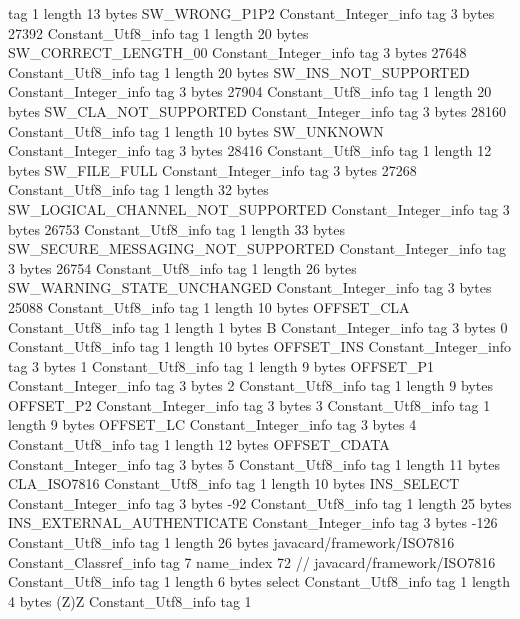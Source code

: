{{{			tag	1
			length	13
			bytes	SW_WRONG_P1P2
		}
		Constant_Integer_info {
			tag	3
			bytes	27392
		}
		Constant_Utf8_info {
			tag	1
			length	20
			bytes	SW_CORRECT_LENGTH_00
		}
		Constant_Integer_info {
			tag	3
			bytes	27648
		}
		Constant_Utf8_info {
			tag	1
			length	20
			bytes	SW_INS_NOT_SUPPORTED
		}
		Constant_Integer_info {
			tag	3
			bytes	27904
		}
		Constant_Utf8_info {
			tag	1
			length	20
			bytes	SW_CLA_NOT_SUPPORTED
		}
		Constant_Integer_info {
			tag	3
			bytes	28160
		}
		Constant_Utf8_info {
			tag	1
			length	10
			bytes	SW_UNKNOWN
		}
		Constant_Integer_info {
			tag	3
			bytes	28416
		}
		Constant_Utf8_info {
			tag	1
			length	12
			bytes	SW_FILE_FULL
		}
		Constant_Integer_info {
			tag	3
			bytes	27268
		}
		Constant_Utf8_info {
			tag	1
			length	32
			bytes	SW_LOGICAL_CHANNEL_NOT_SUPPORTED
		}
		Constant_Integer_info {
			tag	3
			bytes	26753
		}
		Constant_Utf8_info {
			tag	1
			length	33
			bytes	SW_SECURE_MESSAGING_NOT_SUPPORTED
		}
		Constant_Integer_info {
			tag	3
			bytes	26754
		}
		Constant_Utf8_info {
			tag	1
			length	26
			bytes	SW_WARNING_STATE_UNCHANGED
		}
		Constant_Integer_info {
			tag	3
			bytes	25088
		}
		Constant_Utf8_info {
			tag	1
			length	10
			bytes	OFFSET_CLA
		}
		Constant_Utf8_info {
			tag	1
			length	1
			bytes	B
		}
		Constant_Integer_info {
			tag	3
			bytes	0
		}
		Constant_Utf8_info {
			tag	1
			length	10
			bytes	OFFSET_INS
		}
		Constant_Integer_info {
			tag	3
			bytes	1
		}
		Constant_Utf8_info {
			tag	1
			length	9
			bytes	OFFSET_P1
		}
		Constant_Integer_info {
			tag	3
			bytes	2
		}
		Constant_Utf8_info {
			tag	1
			length	9
			bytes	OFFSET_P2
		}
		Constant_Integer_info {
			tag	3
			bytes	3
		}
		Constant_Utf8_info {
			tag	1
			length	9
			bytes	OFFSET_LC
		}
		Constant_Integer_info {
			tag	3
			bytes	4
		}
		Constant_Utf8_info {
			tag	1
			length	12
			bytes	OFFSET_CDATA
		}
		Constant_Integer_info {
			tag	3
			bytes	5
		}
		Constant_Utf8_info {
			tag	1
			length	11
			bytes	CLA_ISO7816
		}
		Constant_Utf8_info {
			tag	1
			length	10
			bytes	INS_SELECT
		}
		Constant_Integer_info {
			tag	3
			bytes	-92
		}
		Constant_Utf8_info {
			tag	1
			length	25
			bytes	INS_EXTERNAL_AUTHENTICATE
		}
		Constant_Integer_info {
			tag	3
			bytes	-126
		}
		Constant_Utf8_info {
			tag	1
			length	26
			bytes	javacard/framework/ISO7816
		}
		Constant_Classref_info {
			tag	7
			name_index	72		// javacard/framework/ISO7816
		}
		Constant_Utf8_info {
			tag	1
			length	6
			bytes	select
		}
		Constant_Utf8_info {
			tag	1
			length	4
			bytes	(Z)Z
		}
		Constant_Utf8_info {
			tag	1
}}}

